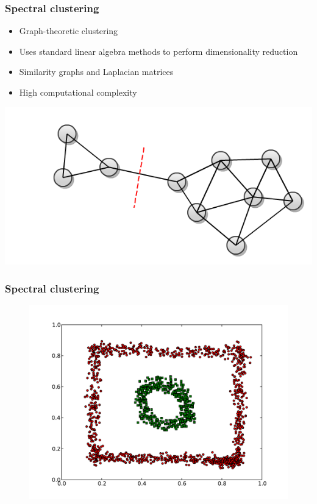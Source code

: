 \documentclass{beamer}
\begin{document}
\begin{frame}
\frametitle{Spectral clustering}
    \begin{itemize}
	\item Graph-theoretic clustering
    	\item Uses standard linear algebra methods to perform dimensionality reduction
   	\item Similarity graphs and Laplacian matrices
    \item High computational complexity
    \end{itemize}

    \begin{center}
    \includegraphics[scale=0.3]{spectral.png}
    \end{center}
\end{frame}

\begin{frame}
\frametitle{Spectral clustering}
    \begin{figure}[]
    \includegraphics[scale=0.5]{spectral_circle-weird.pdf}
    \end{figure}
\end{frame}
\end{document}
